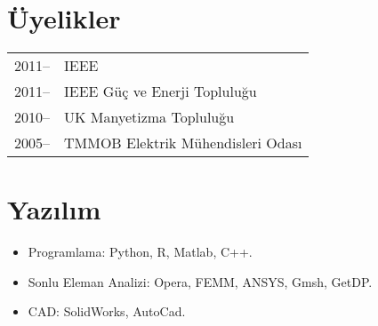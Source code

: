 \documentclass[a4paper,12pt]{article}
\begin{document}


\section{Üyelikler}
\begin{tabular}{ll}
2011-- & IEEE\\
2011-- & IEEE Güç ve Enerji Topluluğu\\
2010-- & UK Manyetizma Topluluğu\\
2005-- & TMMOB Elektrik Mühendisleri Odası\\
\end{tabular}




\section{Yazılım}
\begin{itemize}
\item Programlama: Python, R, Matlab, C++.
\item Sonlu Eleman Analizi: Opera, FEMM, ANSYS, Gmsh, GetDP.
\item CAD: SolidWorks, AutoCad.
\end{itemize}
\end{document}
